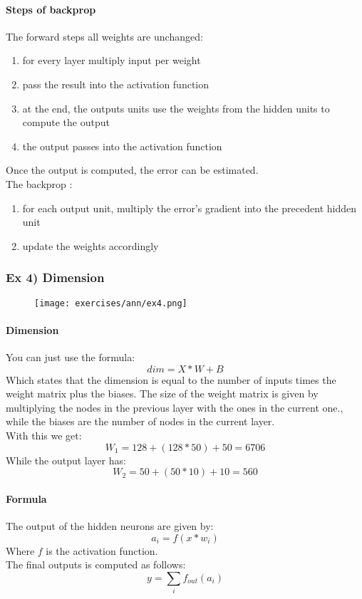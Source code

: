 \paragraph{Steps of backprop}
The forward steps all weights are unchanged:
\begin{enumerate}
\item for every layer multiply input per weight
\item pass the result into the activation function
\item at the end, the outputs units use the weights from the hidden units to compute the output
\item the output passes into the activation function
\end{enumerate}
Once the output is computed, the error can be estimated.\\
The backprop :
\begin{enumerate}
\item for each output unit, multiply the error's gradient into the precedent hidden unit
\item update the weights accordingly
\end{enumerate}

\subsubsection{Ex 4) Dimension}

\begin{figure}[H]
    \centering
    \texttt{[image: exercises/ann/ex4.png]}
\end{figure}

\paragraph{Dimension}
You can just use the formula:
$$dim=X*W+B$$
Which states that the dimension is equal to the number of inputs times the weight matrix plus the biases.
The size of the weight matrix is given by multiplying the nodes in the previous layer with the ones in the current one., while the biases are the number of nodes in the current layer.\\
With this we get:
$$W_1=128+(128*50)+50=6706$$
While the output layer has:
$$W_2=50+(50*10)+10=560$$

\paragraph{Formula}
The output of the hidden neurons are given by:
$$a_i=f(x*w_i)$$
Where $f$ is the activation function.\\
The final outputs is computed as follows:
$$y=\sum_i f_{out}(a_i)$$

